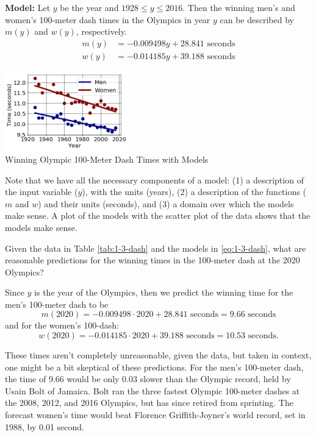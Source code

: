 {\bf Model: } Let $y$ be the year and $1928\le y\le 2016$. Then the winning men's and women's 100-meter dash times in the Olympics in year $y$ can be described by $m(y)$ and $w(y)$, respectively.
\begin{align}
\label{eq:1-3-dash}
m(y) &= -0.009498y + 28.841\mbox{ seconds}\\
w(y) &= -0.014185y + 39.188 \mbox{ seconds}\nonumber
\end{align}

\begin{floatingfigure}{0.4\textwidth}
    \centering
    \includegraphics[width=0.4\textwidth]{img/chap1/sec1-3/fig1-3-dash-curve.png}\\
    \caption{Winning Olympic 100-Meter Dash Times with Models}
    \label{fig:1-3-dash-curve}
    \vspace{12pt}
\end{floatingfigure}
Note that we have all the necessary components of a model: (1) a description of the input variable ($y$), with the units (years), (2) a description of the functions ($m$ and $w$) and their units (seconds), and (3) a domain over which the models make sense. A plot of the models with the scatter plot of the data shows that the models make sense.

\begin{example}
Given the data in Table \ref{tab:1-3-dash} and the models in \eqref{eq:1-3-dash}, what are reasonable predictions for the winning times in the 100-meter dash at the 2020 Olympics?

\begin{solution}
Since $y$ is the year of the Olympics, then we predict the winning time for the men's 100-meter dash to be
$$m(2020) = -0.009498\cdot 2020 + 28.841\mbox{ seconds} = 9.66 \mbox{ seconds}$$
and for the women's 100-dash:
$$w(2020) = -0.014185\cdot 2020 + 39.188\mbox{ seconds} = 10.53 \mbox{ seconds.}$$

These times aren't completely unreasonable, given the data, but taken in context, one might be a bit skeptical of these predictions. For the men's 100-meter dash, the time of 9.66 would be only 0.03 slower than the Olympic record, held by Usain Bolt of Jamaica. Bolt ran the three fastest Olympic 100-meter dashes at the 2008, 2012, and 2016 Olympics, but has since retired from sprinting. The forecast women's time would beat Florence Griffith-Joyner's world record, set in 1988, by 0.01 second.
\end{solution}
\end{example}

